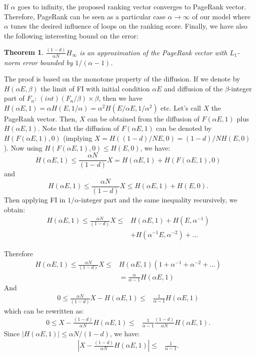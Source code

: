 \documentclass[conference]{IEEEtran}
\newtheorem{theorem}{Theorem}
\begin{document}
\begin{psfrags}
If $\alpha$ goes
to infinity, the proposed ranking vector converges to PageRank vector.
Therefore, PageRank can be seen as a particular case $\alpha\to\infty$ of our model
where $\alpha$ tunes the desired influence of loops on the ranking score.
Finally, we have also the following interesting bound on the error:

\begin{theorem}
$\frac{(1-d)}{\alpha N} H_{\infty}$ is an approximation of the PageRank vector with
$L_1$-norm error bounded by $1/(\alpha-1)$.
\end{theorem}
\proof
The proof is based on the monotone property of the diffusion.
If we denote by $H(\alpha E,\beta)$ the limit of FI with initial condition $\alpha E$
and diffusion of the $\beta$-integer part of $F_n$: $(int)(F_n/\beta)\times\beta$, then
we have $H(\alpha E,1) = \alpha H(E,1/\alpha) = \alpha^2 H(E/\alpha E,1/\alpha^2)$ etc.
Let's call $X$ the PageRank vector. 
Then, $X$ can be obtained from the diffusion
of $F(\alpha E,1)$ plus $H(\alpha E,1)$. Note that the diffusion of  $F(\alpha E,1)$
can be denoted by $H(F(\alpha E,1),0)$ (implying $X = H((1-d)/N E,0) = (1-d)/N H(E,0)$).
Now using $H(F(\alpha E,1),0) \le H(E,0)$, we have:
$$
H(\alpha E,1) \le \frac{\alpha N}{(1-d)}X =  H(\alpha E,1) + H(F(\alpha E,1),0)
$$
and
$$
H(\alpha E,1) \le \frac{\alpha N}{(1-d)} X \le H(\alpha E,1) + H(E,0).
$$
Then applying FI in $1/\alpha$-integer part and the same inequality recursively,
we obtain:
\begin{align*}
H(\alpha E,1) \le \frac{\alpha N}{(1-d)} X \le& H(\alpha E,1) + H(E,\alpha^{-1})\\
& + H(\alpha^{-1} E,\alpha^{-2}) + ...
\end{align*}

Therefore
\begin{align*}
H(\alpha E,1) \le \frac{\alpha N}{(1-d)} X \le& H(\alpha E,1)\left(1 + \alpha^{-1} + \alpha^{-2} + ...\right)\\
& = \frac{\alpha}{\alpha-1}H(\alpha E,1)
\end{align*}
And
\begin{align*}
0 \le \frac{\alpha N}{(1-d)} X - H(\alpha E,1) \le& \frac{1}{\alpha-1}H(\alpha E,1)
\end{align*}
which can be rewritten as:
\begin{align*}
0 \le X - \frac{(1-d)}{\alpha N}H(\alpha E,1) \le& \frac{1}{\alpha-1} \frac{(1-d)}{\alpha N} H(\alpha E,1).
\end{align*}
Since $|H(\alpha E,1)|\le \alpha N /(1-d)$, we have:
\begin{align*}
\left|X - \frac{(1-d)}{\alpha N}H(\alpha E,1)\right| \le& \frac{1}{\alpha-1}.
\end{align*}


\end{psfrags}
\end{document}
